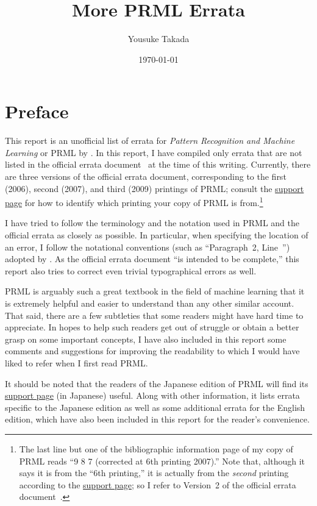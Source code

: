 \documentclass[12pt,a4paper]{article}
\title{More PRML Errata}
\author{Yousuke Takada \\ \email{yousuketakada@gmail.com}}
\date{\today}
\newcommand{\Section}[1]{%
\section*{#1}
\addcontentsline{toc}{section}{#1}}
\begin{document}
\maketitle

\Section{Preface}
This report is an unofficial list of errata for \emph{Pattern Recognition and Machine Learning} or
PRML by \citet*{Bishop:PRML}.
In this report, I have compiled only errata
that are not listed in the official errata document~\citep{Svensen:PRML_errata}
at the time of this writing.
Currently, there are three versions of the official errata document,
corresponding to the first (2006), second (2007), and third (2009) printings of PRML;
consult the
\href{https://www.microsoft.com/en-us/research/people/cmbishop/\#prml-book}{support page}
for how to identify which printing your copy of PRML is from.\footnote{%
The last line but one of the bibliographic information page of my copy of PRML
reads ``9 8 7 (corrected at 6th printing 2007).''
Note that, although it says it is from the ``6th printing,''
it is actually from the \emph{second} printing according to the
\href{https://www.microsoft.com/en-us/research/people/cmbishop/\#prml-book}{support page};
so I refer to Version~2 of the official errata document~\citep{Svensen:PRML_errata}.}

I have tried to follow the terminology and the notation used in PRML and the official errata
as closely as possible.
In particular, when specifying the location of an error,
I follow the notational conventions (such as ``Paragraph~2, Line~'')
adopted by \citet{Svensen:PRML_errata}.
As the official errata document ``is intended to be complete,''
this report also tries to correct even trivial typographical errors as well.

PRML is arguably such a great textbook in the field of machine learning
that it is extremely helpful and easier to understand than any other similar account.
That said, there are a few subtleties
that some readers might have hard time to appreciate.
In hopes to help such readers get out of struggle or
obtain a better grasp on some important concepts,
I have also included in this report some comments and suggestions for improving the readability
to which I would have liked to refer when I first read PRML.

It should be noted that the readers of the Japanese edition of PRML will find its
\href{http://ibisforest.org/index.php?PRML}{support page} (in Japanese) useful.
Along with other information,
it lists errata specific to the Japanese edition as well as
some additional errata for the English edition,
which have also been included in this report for the reader's convenience.
\end{document}
